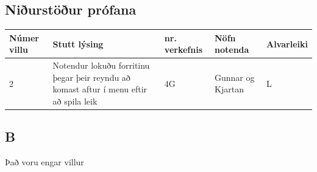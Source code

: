 \documentclass[a4paper]{paper}
\begin{document}
\subsection{Niðurstöður prófana}
\begin{tabular}{|p{}|p{}|p{}|p{}|p{}|}
    \hline
    Númer villu &Stutt lýsing&nr. verkefnis&Nöfn notenda&Alvarleiki\\
    \hline
    2           &Notendur lokuðu forritinu þegar þeir reyndu að komast aftur í menu eftir að spila leik&4G&Gunnar og Kjartan&L\\ 
    \hline          
\end{tabular}

\subsection*{B}
Það voru engar villur

\newpage
\end{document}

